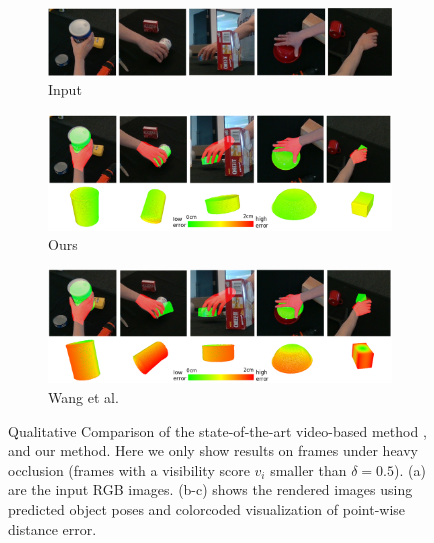 \begin{figure}[!ht]
    \begin{subfigure}{0.98\textwidth}
        \includegraphics[width=\linewidth]{figs/2_rgb}
        \caption{Input}
    \end{subfigure}
    \hfill
    \begin{subfigure}{0.98\textwidth}
        \includegraphics[width=\linewidth]{figs/2_1}
        \caption{Ours}
    \end{subfigure}
    \hfill
    \begin{subfigure}{0.98\textwidth}
        \includegraphics[width=\linewidth]{figs/2_2}
        \caption{Wang et al. \cite{wang2023deep}}
    \end{subfigure}
    \caption{Qualitative Comparison of the state-of-the-art video-based method \cite{wang2023deep}, and our method. Here we only show results on frames under heavy occlusion (frames with a visibility score \( v_i \) smaller than \( \delta = 0.5 \)). (a) are the input RGB images. (b-c) shows the rendered images using predicted object poses and colorcoded visualization of point-wise distance error.}
    \label{fig:result2}
\end{figure}

